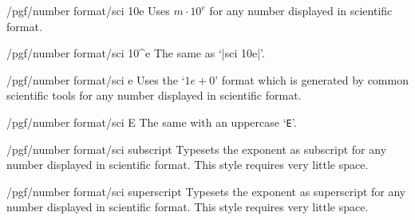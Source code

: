 \begin{key}{/pgf/number format/sci 10e}
  Uses $m \cdot 10^e$ for any number displayed in scientific format. 

\begin{codeexample}[]
\end{codeexample}
\end{key}

\begin{key}{/pgf/number format/sci 10\textasciicircum e}
  The same as `|sci 10e|'.
\end{key}

\begin{key}{/pgf/number format/sci e}
  Uses the `$1e{+}0$' format which is generated by common scientific
  tools for any number displayed in scientific format. 

\begin{codeexample}[]
\end{codeexample}
\end{key}

\begin{key}{/pgf/number format/sci E}
  The same with an uppercase `\texttt{E}'.

\begin{codeexample}[]
\end{codeexample}
\end{key}

\begin{key}{/pgf/number format/sci subscript}
  Typesets the exponent as subscript for any number displayed in
  scientific format. This style requires very little space. 

\begin{codeexample}[]
\end{codeexample}
\end{key}

\begin{key}{/pgf/number format/sci superscript}
  Typesets the exponent as superscript for any number displayed in
  scientific format. This style requires very little space. 

\begin{codeexample}[]
\end{codeexample}
\end{key}

